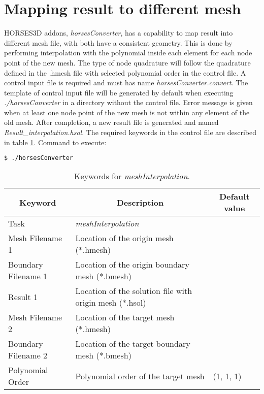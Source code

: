 \documentclass[a4paper,10pt]{report}
\begin{document}
\section{Mapping result to different mesh} \label{tab:meshInterpolation}
HORSES3D addons, \textit{horsesConverter}, has a capability to map result into different mesh file, with both have a consistent geometry. This is done by performing interpolation with the polynomial inside each element for each node point of the new mesh. The type of node quadrature will follow the quadrature defined in the .hmesh file with selected polynomial order in the control file. A control input file is required and must has name \textit{horsesConverter.convert}. The template of control input file will be generated by default when executing \textit{./horsesConverter} in a directory without the control file. Error message is given when at least one node point of the new mesh is not within any element of the old mesh. After completion, a new result file is generated and named \textit{Result\_interpolation.hsol}. The required keywords in the control file are described in table \ref{tab:mappingresult}. Command to execute:

\begin{lstlisting}[language=bash]
	$ ./horsesConverter
\end{lstlisting}

\begin{longtable}{|p{4cm}|p{10cm}|p{2.2cm}|}
\caption{Keywords for \textit{meshInterpolation}.} \label{tab:mappingresult} \\
\hline
\multicolumn{1}{|c|}{\textbf{Keyword}} & \multicolumn{1}{c|}{\textbf{Description}} & \multicolumn{1}{c|}{\textbf{Default value}} \\ \hline
\endfirsthead

Task 	        		& \textit{meshInterpolation} 						&  \\ \hline
Mesh Filename 1 		& Location of the origin mesh (*.hmesh) 	&  \\ \hline
Boundary Filename 1 	& Location of the origin boundary mesh (*.bmesh) 	&  \\ \hline
Result 1 			& Location of the solution file with origin mesh (*.hsol) 	&  \\ \hline
Mesh Filename 2 		& Location of the target mesh (*.hmesh) 	&  \\ \hline
Boundary Filename 2 	& Location of the target boundary mesh (*.bmesh) 	&  \\ \hline
Polynomial Order 	& Polynomial order of the target mesh 	& (1, 1, 1) \\ \hline
\end{longtable}
\end{document}
